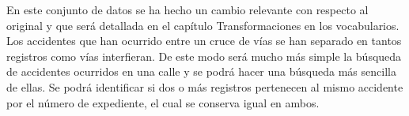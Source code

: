 En este conjunto de datos se ha hecho un cambio relevante con respecto al original y que será detallada en el capítulo Transformaciones en los vocabularios. Los accidentes que han ocurrido entre un cruce de vías se han separado en tantos registros como vías interfieran. De este modo será mucho más simple la búsqueda de accidentes ocurridos en una calle y se podrá hacer una búsqueda más sencilla de ellas. Se podrá identificar si dos o más registros pertenecen al mismo accidente por el número de expediente, el cual se conserva igual en ambos.




